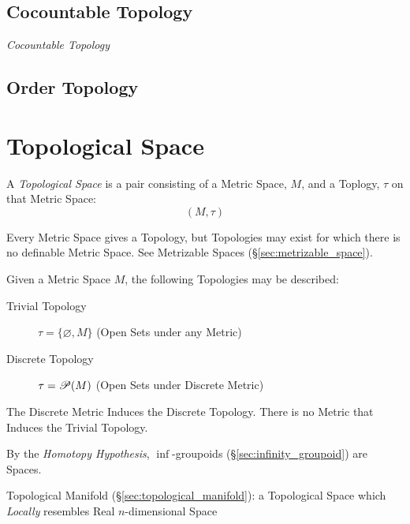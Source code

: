 \subsection{Cocountable Topology}\label{sec:cocountable_topology}

\emph{Cocountable Topology}



\subsection{Order Topology}\label{sec:order_topology}



\section{Topological Space}\label{sec:topological_space}

A \emph{Topological Space} is a pair consisting of a Metric Space,
$M$, and a Toplogy, $\tau$ on that Metric Space:
\[
  (M,\tau)
\]

Every Metric Space gives a Topology, but Topologies may exist for
which there is no definable Metric Space. See Metrizable Spaces
(\S\ref{sec:metrizable_space}).

Given a Metric Space $M$, the following Topologies may be described:
\begin{description}
\item[Trivial Topology] $\tau = \{\varnothing, M\}$ (Open Sets under
  any Metric)

\item[Discrete Topology] $\tau = \mathscr{P}(M)$ (Open Sets under
  Discrete Metric)
\end{description}
The Discrete Metric Induces the Discrete Topology. There is no Metric
that Induces the Trivial Topology.

By the \emph{Homotopy Hypothesis}, $\inf$-groupoids
(\S\ref{sec:infinity_groupoid}) are Spaces.

\fist Topological Manifold (\S\ref{sec:topological_manifold}): a Topological
Space which \emph{Locally} resembles Real $n$-dimensional Space

